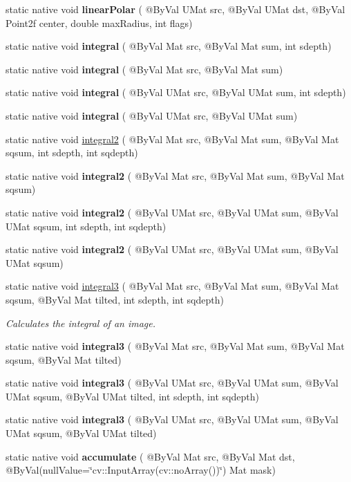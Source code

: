 \begin{DoxyCompactItemize}
static native void {\bfseries linear\+Polar} ( @By\+Val U\+Mat src, @By\+Val U\+Mat dst, @By\+Val Point2f center, double max\+Radius, int flags)
\item 
static native void {\bfseries integral} ( @By\+Val Mat src, @By\+Val Mat sum, int sdepth)
\item 
static native void {\bfseries integral} ( @By\+Val Mat src, @By\+Val Mat sum)
\item 
static native void {\bfseries integral} ( @By\+Val U\+Mat src, @By\+Val U\+Mat sum, int sdepth)
\item 
static native void {\bfseries integral} ( @By\+Val U\+Mat src, @By\+Val U\+Mat sum)
\item 
static native void \hyperlink{group__imgproc__misc_ga7c3e8cf075507c80c07a1fd8cd8969de}{integral2} ( @By\+Val Mat src, @By\+Val Mat sum, @By\+Val Mat sqsum, int sdepth, int sqdepth)
\item 
static native void {\bfseries integral2} ( @By\+Val Mat src, @By\+Val Mat sum, @By\+Val Mat sqsum)
\item 
static native void {\bfseries integral2} ( @By\+Val U\+Mat src, @By\+Val U\+Mat sum, @By\+Val U\+Mat sqsum, int sdepth, int sqdepth)
\item 
static native void {\bfseries integral2} ( @By\+Val U\+Mat src, @By\+Val U\+Mat sum, @By\+Val U\+Mat sqsum)
\item 
static native void \hyperlink{group__imgproc__misc_gaac16fc19a4025e3133ded033405c8e25}{integral3} ( @By\+Val Mat src, @By\+Val Mat sum, @By\+Val Mat sqsum, @By\+Val Mat tilted, int sdepth, int sqdepth)
\begin{DoxyCompactList}\small\item\em Calculates the integral of an image. \end{DoxyCompactList}\item 
static native void {\bfseries integral3} ( @By\+Val Mat src, @By\+Val Mat sum, @By\+Val Mat sqsum, @By\+Val Mat tilted)
\item 
static native void {\bfseries integral3} ( @By\+Val U\+Mat src, @By\+Val U\+Mat sum, @By\+Val U\+Mat sqsum, @By\+Val U\+Mat tilted, int sdepth, int sqdepth)
\item 
static native void {\bfseries integral3} ( @By\+Val U\+Mat src, @By\+Val U\+Mat sum, @By\+Val U\+Mat sqsum, @By\+Val U\+Mat tilted)
\item 
static native void {\bfseries accumulate} ( @By\+Val Mat src, @By\+Val Mat dst, @By\+Val(null\+Value=\char`\"{}cv\+::\+Input\+Array(cv\+::no\+Array())\char`\"{}) Mat mask)

\end{DoxyCompactItemize}
